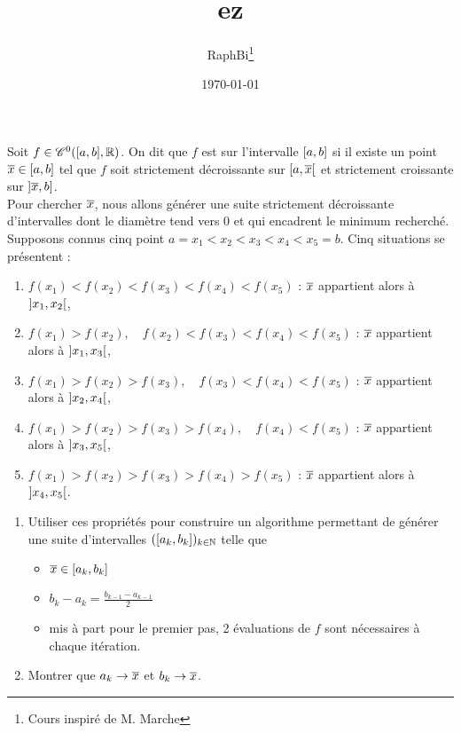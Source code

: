 \documentclass[french,a4paper,10pt]{article}
\title{\color{astral} \sffamily \bfseries ez}
\author{RaphBi\thanks{Cours inspiré de M. Marche}}
\date{\today}
\begin{document}
	\maketitle
	\begin{td-exo}
		Soit $f\in\mathscr{C}^0(\mathopen{[}a,b\mathclose{]},\mathbb{R})$. On dit que $f$ est  sur l'intervalle $\mathopen{[}a,b\mathclose{]}$ si il existe un point $\overline{x}\in\mathopen{[}a,b\mathclose{]}$ tel que $f$ soit strictement décroissante sur $\mathopen{[}a,\overline{x}\mathclose{[}$ et strictement croissante sur $\mathopen{]}\overline{x}, b\mathclose{]}$.\\
		
		Pour chercher $\overline{x}$, nous allons générer une suite strictement décroissante d'intervalles dont le diamètre tend vers 0 et qui encadrent le minimum recherché.\\
		
		Supposons connus cinq point $a=x_1<x_2<x_3<x_4<x_5=b$. Cinq situations se présentent :
			\begin{enumerate}[label=$(\roman*)$]
				\item $f(x_1)<f(x_2)<f(x_3)<f(x_4)<f(x_5)$ : $\overline{x}$ appartient alors à $\mathopen{]}x_1,x_2\mathclose{[}$,
				
				\item $f(x_1)>f(x_2),\quad f(x_2)<f(x_3)<f(x_4)<f(x_5)$ : $\overline{x}$ appartient alors à $\mathopen{]}x_1,x_3\mathclose{[}$,
				
				\item $f(x_1)>f(x_2)>f(x_3),\quad f(x_3)<f(x_4)<f(x_5)$ : $\overline{x}$ appartient alors à $\mathopen{]}x_2,x_4\mathclose{[}$,
				
				\item $f(x_1)>f(x_2)>f(x_3)>f(x_4),\quad f(x_4)<f(x_5)$ : $\overline{x}$ appartient alors à $\mathopen{]}x_3,x_5\mathclose{[}$,
				
				\item $f(x_1)>f(x_2)>f(x_3)>f(x_4)>f(x_5)$ : $\overline{x}$ appartient alors à $\mathopen{]}x_4,x_5\mathclose{[}$.
			\end{enumerate}
		\begin{enumerate}
			\item Utiliser ces propriétés pour construire un algorithme permettant de générer une suite d'intervalles $(\mathopen{[}a_k,b_k\mathclose{]})_{k\in\mathbb{N}}$ telle que
				\begin{itemize}
					\item $\overline{x}\in\mathopen{[}a_k,b_k\mathclose{]}$
					
					\item $b_k-a_k=\frac{b_{k-1}-a_{k-1}}2$
					
					\item mis à part pour le premier pas, 2 évaluations de $f$ sont nécessaires à chaque itération.
				\end{itemize}
			\item Montrer que $a_k\to\overline{x}$ et $b_k\to \overline{x}$.
		\end{enumerate}
	\end{td-exo}
	
\end{document}
